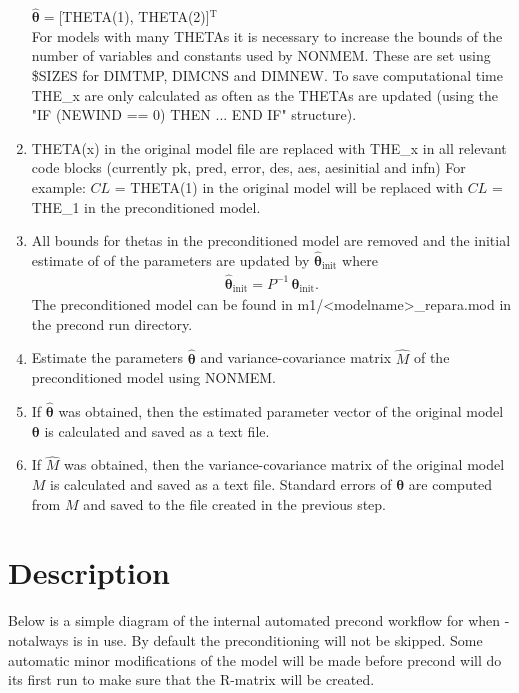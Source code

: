 \begin{enumerate}
        \indent $\hat{\boldsymbol{\theta}}=$[THETA(1), THETA(2)]$^\textrm{T}$\\
        For models with many THETAs it is necessary to increase the bounds of the number of variables and constants used by NONMEM. These are set using \$SIZES for DIMTMP, DIMCNS and DIMNEW. To save computational time THE\_x are only calculated as often as the THETAs are updated (using the "IF (NEWIND == 0) THEN ... END IF" structure).
    \item THETA(x) in the original model file are replaced with THE\_x in all relevant code blocks (currently pk, pred, error, des, aes, aesinitial and infn)
        For example: $CL$ = THETA(1) in the original model will be replaced with $CL$ = THE\_1 in the preconditioned model.

	\item All bounds for thetas in the preconditioned model are removed and the initial estimate of of the parameters are updated by $\hat{\boldsymbol{\theta}}_\textrm{init}$ where
	\begin{eqnarray*}
	    \hat{\boldsymbol{\theta}}_\textrm{init}= P^{-1} \,{\boldsymbol{\theta}}_\textrm{init}.
	\end{eqnarray*}
	The preconditioned model can be found in m1/<modelname>\_repara.mod in the precond run directory.
	\item Estimate the parameters $\hat{\boldsymbol{\theta}}$ and variance-covariance matrix $\hat{M}$ of the preconditioned model using NONMEM.
	\item If $\hat{\boldsymbol{\theta}}$ was obtained, then the estimated parameter vector of the original model $\boldsymbol{\theta}$ is calculated and saved as a text file.
	\item If $\hat{M}$ was obtained, then the variance-covariance matrix of the original model $M$ is calculated and saved as a text file. Standard errors of $\boldsymbol{\theta}$ are computed from $M$ and saved to the file created in the previous step.
\end{enumerate}

\section{Description}

Below is a simple diagram of the internal automated precond workflow for when -notalways is in use. By default the preconditioning will not be skipped. Some automatic minor modifications of the model will be made before precond will do its first run to make sure that the R-matrix will be created.

